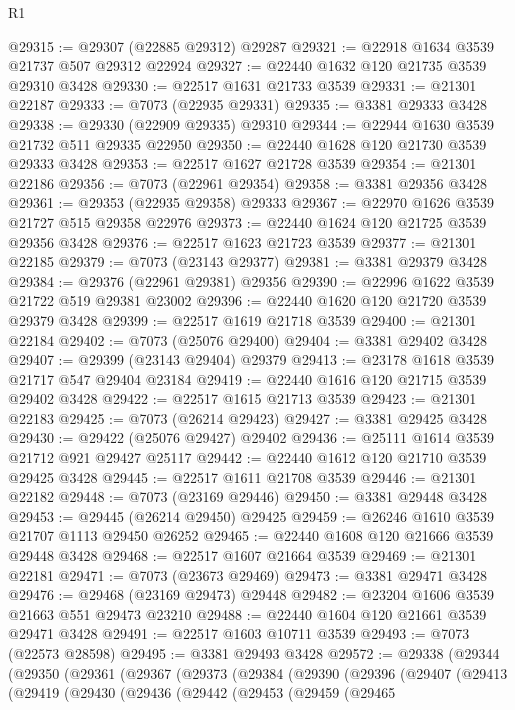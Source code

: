 \begin{lexlean}{R1}
\begin{coremodule}
@29315 := @29307 (@22885 @29312) @29287
@29321 := @22918 @1634 @3539 @21737 @507 @29312 @22924
@29327 := @22440 @1632 @120 @21735 @3539 @29310 @3428
@29330 := @22517 @1631 @21733 @3539
@29331 := @21301 @22187
@29333 := @7073 (@22935 @29331)
@29335 := @3381 @29333 @3428
@29338 := @29330 (@22909 @29335) @29310
@29344 := @22944 @1630 @3539 @21732 @511 @29335 @22950
@29350 := @22440 @1628 @120 @21730 @3539 @29333 @3428
@29353 := @22517 @1627 @21728 @3539
@29354 := @21301 @22186
@29356 := @7073 (@22961 @29354)
@29358 := @3381 @29356 @3428
@29361 := @29353 (@22935 @29358) @29333
@29367 := @22970 @1626 @3539 @21727 @515 @29358 @22976
@29373 := @22440 @1624 @120 @21725 @3539 @29356 @3428
@29376 := @22517 @1623 @21723 @3539
@29377 := @21301 @22185
@29379 := @7073 (@23143 @29377)
@29381 := @3381 @29379 @3428
@29384 := @29376 (@22961 @29381) @29356
@29390 := @22996 @1622 @3539 @21722 @519 @29381 @23002
@29396 := @22440 @1620 @120 @21720 @3539 @29379 @3428
@29399 := @22517 @1619 @21718 @3539
@29400 := @21301 @22184
@29402 := @7073 (@25076 @29400)
@29404 := @3381 @29402 @3428
@29407 := @29399 (@23143 @29404) @29379
@29413 := @23178 @1618 @3539 @21717 @547 @29404 @23184
@29419 := @22440 @1616 @120 @21715 @3539 @29402 @3428
@29422 := @22517 @1615 @21713 @3539
@29423 := @21301 @22183
@29425 := @7073 (@26214 @29423)
@29427 := @3381 @29425 @3428
@29430 := @29422 (@25076 @29427) @29402
@29436 := @25111 @1614 @3539 @21712 @921 @29427 @25117
@29442 := @22440 @1612 @120 @21710 @3539 @29425 @3428
@29445 := @22517 @1611 @21708 @3539
@29446 := @21301 @22182
@29448 := @7073 (@23169 @29446)
@29450 := @3381 @29448 @3428
@29453 := @29445 (@26214 @29450) @29425
@29459 := @26246 @1610 @3539 @21707 @1113 @29450 @26252
@29465 := @22440 @1608 @120 @21666 @3539 @29448 @3428
@29468 := @22517 @1607 @21664 @3539
@29469 := @21301 @22181
@29471 := @7073 (@23673 @29469)
@29473 := @3381 @29471 @3428
@29476 := @29468 (@23169 @29473) @29448
@29482 := @23204 @1606 @3539 @21663 @551 @29473 @23210
@29488 := @22440 @1604 @120 @21661 @3539 @29471 @3428
@29491 := @22517 @1603 @10711 @3539
@29493 := @7073 (@22573 @28598)
@29495 := @3381 @29493 @3428
@29572 := @29338
    (@29344
      (@29350
        (@29361
          (@29367
            (@29373
              (@29384
                (@29390
                  (@29396
                    (@29407
                      (@29413
                        (@29419
                          (@29430
                            (@29436
                              (@29442
                                (@29453
                                  (@29459
                                    (@29465

\end{coremodule}
\end{lexlean}
